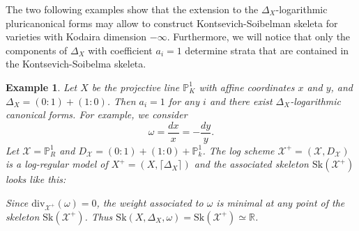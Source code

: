 \documentclass{amsart}%
\numberwithin{equation}{subsection}
\theoremstyle{plain2}
\theoremstyle{definition2}
\newtheorem{example}[equation]{Example}
\theoremstyle{stepstyle}
\theoremstyle{point}
\theoremstyle{subpoint}
\newcommand{\R}{\ensuremath{\mathbb{R}}}
\newcommand{\cX}{\ensuremath{\mathscr{X}}}
\renewcommand{\R}{\ensuremath{\mathbb{R}}}
\newcommand{\divisor}{\mathrm{div}}
\newcommand{\Sk}{\mathrm{Sk}}
\begin{document}
The two following examples show that the extension to the $\Delta_X$-logarithmic pluricanonical forms may allow to construct Kontsevich-Soibelman skeleta for varieties with Kodaira dimension $-\infty$. Furthermore, we will notice that only the components of $\Delta_X$ with coefficient $a_i=1$ determine strata that are contained in the Kontsevich-Soibelma skeleta.

\begin{example}
Let $X$ be the projective line $\mathbb{P}^1_K$ with affine coordinates $x$ and $y$, and $\Delta_X=(0:1) + (1:0)$. Then $a_i=1$ for any $i$ and there exist $\Delta_X$-logarithmic canonical forms. For example, we consider $$\omega =  \frac{dx}{x}= -\frac{dy}{y}.$$ Let $\cX= \mathbb{P}_R^1$ and $D_\cX= (0:1) + (1:0)+ \mathbb{P}^1_k$. The log scheme $\cX^+=(\cX,D_\cX)$ is a log-regular model of $X^+=(X,\lceil \Delta_X \rceil)$ and the associated skeleton $\Sk(\cX^+)$ looks like this:
\begin{center}
\end{center}
Since $\divisor_{\cX^+}(\omega)= 0$, the weight associated to $\omega$ is minimal at any point of the skeleton $\Sk(\cX^+)$. Thus $\Sk(X,\Delta_X,\omega)=\Sk(\cX^+) \simeq \R$.
\end{example}
\end{document}
